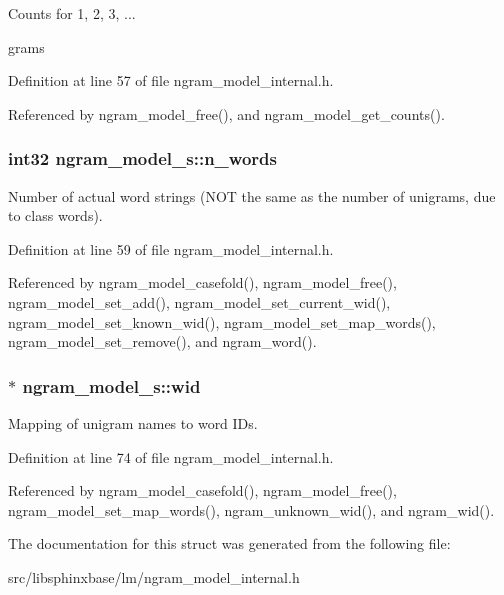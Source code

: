 Counts for 1, 2, 3, ... 

grams 

Definition at line 57 of file ngram\-\_\-model\-\_\-internal.\-h.



Referenced by ngram\-\_\-model\-\_\-free(), and ngram\-\_\-model\-\_\-get\-\_\-counts().

\subsubsection[{n\-\_\-words}]{\setlength{\rightskip}{0pt plus 5cm}int32 ngram\-\_\-model\-\_\-s\-::n\-\_\-words}\label{structngram__model__s_a74f85927ef0d5513a1e6c02d13864be3}


Number of actual word strings (N\-O\-T the same as the number of unigrams, due to class words). 



Definition at line 59 of file ngram\-\_\-model\-\_\-internal.\-h.



Referenced by ngram\-\_\-model\-\_\-casefold(), ngram\-\_\-model\-\_\-free(), ngram\-\_\-model\-\_\-set\-\_\-add(), ngram\-\_\-model\-\_\-set\-\_\-current\-\_\-wid(), ngram\-\_\-model\-\_\-set\-\_\-known\-\_\-wid(), ngram\-\_\-model\-\_\-set\-\_\-map\-\_\-words(), ngram\-\_\-model\-\_\-set\-\_\-remove(), and ngram\-\_\-word().

\subsubsection[{wid}]{$\ast$ ngram\-\_\-model\-\_\-s\-::wid}\label{structngram__model__s_a75567419a8002ef6e916c81f5d9ee9ed}


Mapping of unigram names to word I\-Ds. 



Definition at line 74 of file ngram\-\_\-model\-\_\-internal.\-h.



Referenced by ngram\-\_\-model\-\_\-casefold(), ngram\-\_\-model\-\_\-free(), ngram\-\_\-model\-\_\-set\-\_\-map\-\_\-words(), ngram\-\_\-unknown\-\_\-wid(), and ngram\-\_\-wid().



The documentation for this struct was generated from the following file\-:\begin{DoxyCompactItemize}
\item 
src/libsphinxbase/lm/ngram\-\_\-model\-\_\-internal.\-h\end{DoxyCompactItemize}
